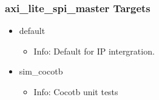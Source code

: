 \subsubsection{axi\_lite\_spi\_master Targets}
\begin{itemize}
\item default
	\begin{itemize}
	\item[$\space$] Info: Default for IP intergration.
	\end{itemize}
\item sim\_cocotb
	\begin{itemize}
	\item[$\space$] Info: Cocotb unit tests
	\end{itemize}
\end{itemize}
